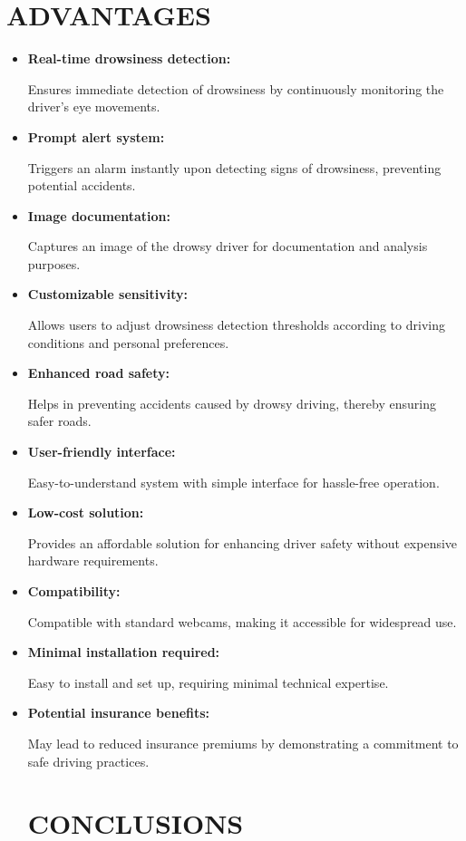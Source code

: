 \documentclass[12pt]{article}
\begin{document}
\section{ADVANTAGES }
\begin{itemize}
\item \textbf{Real-time drowsiness detection:} 

Ensures immediate detection of drowsiness by continuously monitoring the driver's eye movements.
\item \textbf{Prompt alert system: }

Triggers an alarm instantly upon detecting signs of drowsiness, preventing potential accidents.
\item \textbf{Image documentation: }

Captures an image of the drowsy driver for documentation and analysis purposes.
\item \textbf{Customizable sensitivity: }

Allows users to adjust drowsiness detection thresholds according to driving conditions and personal preferences.
\item \textbf{Enhanced road safety: }

Helps in preventing accidents caused by drowsy driving, thereby ensuring safer roads.
\item \textbf{User-friendly interface: }

Easy-to-understand system with simple interface for hassle-free operation.
\item \textbf{Low-cost solution: }

Provides an affordable solution for enhancing driver safety without expensive hardware requirements.
\item \textbf{Compatibility: }

Compatible with standard webcams, making it accessible for widespread use.
\item \textbf{Minimal installation required: }

Easy to install and set up, requiring minimal technical expertise.
\item \textbf{Potential insurance benefits:} 

May lead to reduced insurance premiums by demonstrating a commitment to safe driving practices.


\newpage
\section{ CONCLUSIONS }


\end{itemize}
\end{document}
